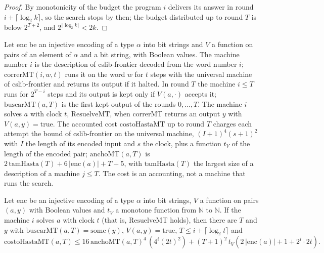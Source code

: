 \begin{proof}
  \leanok
  By monotonicity of the budget the program $i$ delivers its answer in round $i + \lceil \log_2 k
  \rceil$, so the search stops by then; the budget distributed up to round $T$ is below $2^{T+2}$,
  and $2^{\lceil \log_2 k \rceil} < 2k$.
\end{proof}

\begin{definition}
  \label{def:search-levin-mt}
  \leanok
  Let $\mathrm{enc}$ be an injective encoding of a type $\alpha$ into bit strings and $V$ a function
  on pairs of an element of $\alpha$ and a bit string, with Boolean values. The machine number $i$
  is the description of cslib-frontier decoded from the word number $i$; $\mathrm{correrMT}(i, w,
  t)$ runs it on the word $w$ for $t$ steps with the universal machine of cslib-frontier and
  returns its output if it halted. In round $T$ the machine $i \le T$ runs for $2^{T-i}$ steps and
  its output is kept only if $V(a, \cdot)$ accepts it; $\mathrm{buscarMT}(a, T)$ is the first kept output of
  the rounds $0, \dots, T$. The machine $i$ solves $a$ with clock $t$, $\mathrm{ResuelveMT}$, when
  $\mathrm{correrMT}$ returns an output $y$ with $V(a, y) = \mathrm{true}$. The accounted cost
  $\mathrm{costoHastaMT}$ up to round $T$ charges each attempt the bound of cslib-frontier on the
  universal machine, $(I+1)^4 (s+1)^2$ with $I$ the length of its encoded input and $s$ the clock,
  plus a function $t_V$ of the length of the encoded pair; $\mathrm{anchoMT}(a, T)$ is $2\,\mathrm{tamHasta}(T)
  + 6\,|\mathrm{enc}(a)| + T + 5$, with $\mathrm{tamHasta}(T)$ the largest size of a description of a
  machine $j \le T$. The cost is an accounting, not a machine that runs the search.
  \own{}
\end{definition}

\begin{theorem}
  \label{thm:search-levin-mt}
  \leanok
  Let $\mathrm{enc}$ be an injective encoding of a type $\alpha$ into bit strings, $V$ a function on
  pairs $(a, y)$ with Boolean values and $t_V$ a monotone function from $\mathbb{N}$ to $\mathbb{N}$.
  If the machine $i$ solves $a$ with clock $t$ (that is, $\mathrm{ResuelveMT}$ holds), then there are $T$
  and $y$ with $\mathrm{buscarMT}(a, T) = \mathrm{some}(y)$, $V(a, y) = \mathrm{true}$,
  $T \le i + \lceil \log_2 t \rceil$ and
  \[
    \mathrm{costoHastaMT}(a, T) \le 16\,\mathrm{anchoMT}(a, T)^4 \,(4^i (2t)^2)
      + (T+1)^2\, t_V(2\,|\mathrm{enc}(a)| + 1 + 2^i \cdot 2t).
  \]
\end{theorem}

